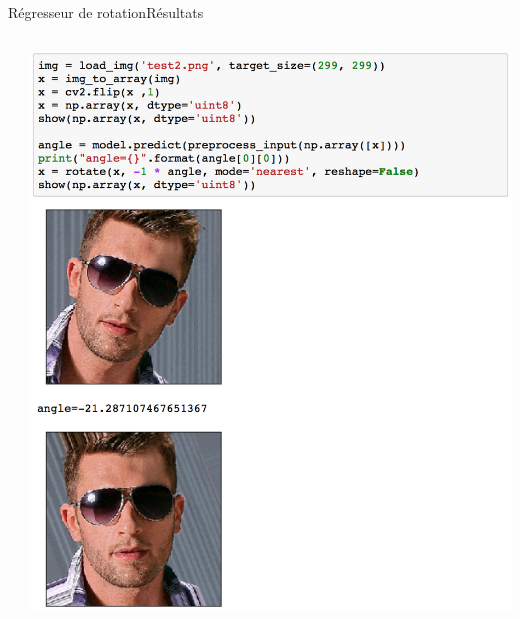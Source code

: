 \documentclass[compress]{beamer}
\begin{document}
\begin{frame}{Régresseur de rotation}{Résultats}
\begin{columns}
\begin{column}{0.333\linewidth}
    \end{column}
    \begin{column}{0.333\linewidth}\scriptsize
      \includegraphics[width=\linewidth]{resources/rotationreg3}
    \end{column}
  \end{columns}

\end{frame}
\end{document}

